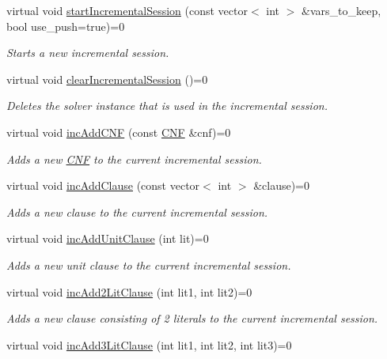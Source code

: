 \begin{DoxyCompactItemize}
virtual void \hyperlink{classSatSolver_a74603f84c3f2383a5fc44d5a8093cbea}{start\-Incremental\-Session} (const vector$<$ int $>$ \&vars\-\_\-to\-\_\-keep, bool use\-\_\-push=true)=0
\begin{DoxyCompactList}\small\item\em Starts a new incremental session. \end{DoxyCompactList}\item 
virtual void \hyperlink{classSatSolver_a8118d2900f7acf31497cd2a27ad3b713}{clear\-Incremental\-Session} ()=0
\begin{DoxyCompactList}\small\item\em Deletes the solver instance that is used in the incremental session. \end{DoxyCompactList}\item 
virtual void \hyperlink{classSatSolver_ab2581b192cb2c39a81a416a9f7416c9e}{inc\-Add\-C\-N\-F} (const \hyperlink{classCNF}{C\-N\-F} \&cnf)=0
\begin{DoxyCompactList}\small\item\em Adds a new \hyperlink{classCNF}{C\-N\-F} to the current incremental session. \end{DoxyCompactList}\item 
virtual void \hyperlink{classSatSolver_a9f91c104238b6e091513e0aa46970840}{inc\-Add\-Clause} (const vector$<$ int $>$ \&clause)=0
\begin{DoxyCompactList}\small\item\em Adds a new clause to the current incremental session. \end{DoxyCompactList}\item 
virtual void \hyperlink{classSatSolver_a5b39c45cd2a1abfe96c681515dfddb77}{inc\-Add\-Unit\-Clause} (int lit)=0
\begin{DoxyCompactList}\small\item\em Adds a new unit clause to the current incremental session. \end{DoxyCompactList}\item 
virtual void \hyperlink{classSatSolver_a791be541b59ef58a29a1c517fca943e7}{inc\-Add2\-Lit\-Clause} (int lit1, int lit2)=0
\begin{DoxyCompactList}\small\item\em Adds a new clause consisting of 2 literals to the current incremental session. \end{DoxyCompactList}\item 
virtual void \hyperlink{classSatSolver_abca288874a1b8ab1a90cb274eb885ace}{inc\-Add3\-Lit\-Clause} (int lit1, int lit2, int lit3)=0

\end{DoxyCompactItemize}
